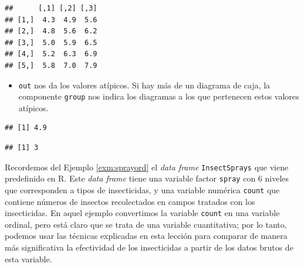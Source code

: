 \documentclass[]{book}
\newenvironment{Shaded}{\begin{snugshade}}{\end{snugshade}}
\newcommand{\DataTypeTok}[1]{\textcolor[rgb]{0.13,0.29,0.53}{#1}}
\newcommand{\KeywordTok}[1]{\textcolor[rgb]{0.13,0.29,0.53}{\textbf{#1}}}
\newcommand{\NormalTok}[1]{#1}
\newcommand{\OperatorTok}[1]{\textcolor[rgb]{0.81,0.36,0.00}{\textbf{#1}}}
\newcommand{\OtherTok}[1]{\textcolor[rgb]{0.56,0.35,0.01}{#1}}
\providecommand{\tightlist}{%
  \setlength{\itemsep}{0pt}\setlength{\parskip}{0pt}}
\theoremstyle{definition}
\theoremstyle{definition}
\theoremstyle{definition}
\theoremstyle{remark}
\let\BeginKnitrBlock\begin \let\EndKnitrBlock\end
\begin{document}
\begin{Shaded}
\end{Shaded}

\begin{verbatim}
##      [,1] [,2] [,3]
## [1,]  4.3  4.9  5.6
## [2,]  4.8  5.6  6.2
## [3,]  5.0  5.9  6.5
## [4,]  5.2  6.3  6.9
## [5,]  5.8  7.0  7.9
\end{verbatim}

\begin{itemize}
\tightlist
\item
  \texttt{out} nos da los valores atípicos. Si hay más de un diagrama de caja, la componente \texttt{group} nos indica los diagramas a los que pertenecen estos valores atípicos.
\end{itemize}

\begin{Shaded}
\end{Shaded}

\begin{verbatim}
## [1] 4.9
\end{verbatim}

\begin{Shaded}
\end{Shaded}

\begin{verbatim}
## [1] 3
\end{verbatim}

\BeginKnitrBlock{example}
\protect\hypertarget{exm:unnamed-chunk-606}{}{\label{exm:unnamed-chunk-606} }Recordemos del Ejemplo \ref{exm:sprayord} el \emph{data frame} \texttt{InsectSprays} que viene predefinido en R. Este \emph{data frame} tiene una variable factor \texttt{spray} con 6 niveles que corresponden a tipos de insecticidas, y una variable numérica \texttt{count} que contiene números de insectos recolectados en campos tratados con los insecticidas. En aquel ejemplo convertimos la variable \texttt{count} en una variable ordinal, pero está claro que se trata de una variable cuantitativa; por lo tanto, podemos usar las técnicas explicadas en esta lección para comparar de manera más significativa la efectividad de los insecticidas a partir de los datos brutos de esta variable.
\EndKnitrBlock{example}
\end{document}
